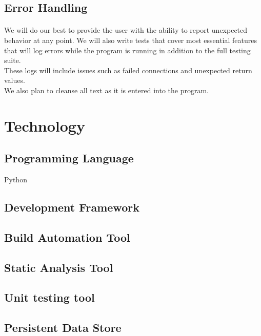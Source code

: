 \documentclass{article}
\begin{document}
\subsection{Error Handling}

\paragraph{}

We will do our best to provide the user with the ability to report unexpected behavior at any point. We will also write tests that cover most essential features that will log errors while the program is running in addition to the full testing suite.\\

These logs will include issues such as failed connections and unexpected return values.\\

We also plan to cleanse all text as it is entered into the program.

\section{Technology}

\subsection{Programming Language}
Python
\subsection{Development Framework}

\subsection{Build Automation Tool}

\subsection{Static Analysis Tool}

\subsection{Unit testing tool}

\subsection{Persistent Data Store} 
\end{document}
